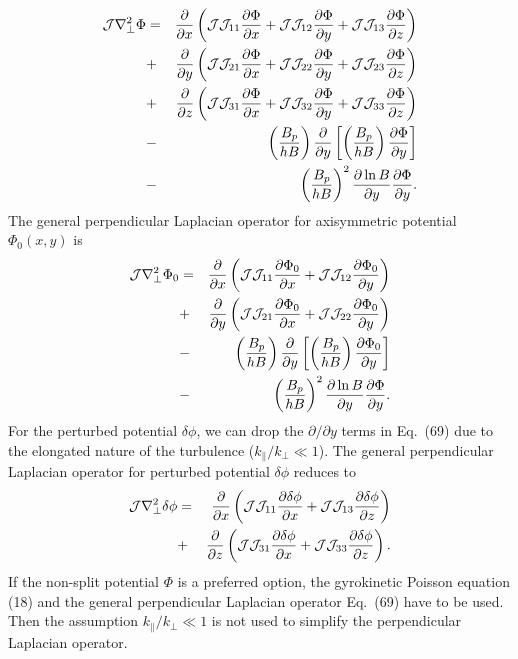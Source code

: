 \documentclass [11pt]{article}
\begin{document}
\begin{eqnarray}
{\cal J}\nabla_\perp^2\Phi&=&{\partial\over\partial x}\left({\cal J}{\cal J}_{11}{\partial\Phi\over\partial x}
+{\cal J}{\cal J}_{12}{\partial\Phi\over\partial y}
+{\cal J}{\cal J}_{13}{\partial\Phi\over\partial z}\right) \nonumber\\
&+&{\partial\over\partial y}\left({\cal J}{\cal J}_{21}{\partial\Phi\over\partial x}
+{\cal J}{\cal J}_{22}{\partial\Phi\over\partial y}
+{\cal J}{\cal J}_{23}{\partial\Phi\over\partial z}\right) \nonumber\\
&+&{\partial\over\partial z}\left({\cal J}{\cal J}_{31}{\partial\Phi\over\partial x}
+{\cal J}{\cal J}_{32}{\partial\Phi\over\partial y}
+{\cal J}{\cal J}_{33}{\partial\Phi\over\partial z}\right) \nonumber\\
&-&\left({B_p\over hB}\right){\partial\over\partial y}
\left[\left({B_p\over hB}\right){\partial\Phi\over\partial y}\right] \nonumber\\
&-&\left({B_p\over hB}\right)^2{\partial\ln B\over\partial y}{\partial\Phi\over\partial y}.
\end{eqnarray}
The general perpendicular Laplacian operator for axisymmetric potential $\Phi_0(x,y)$ is
\begin{eqnarray}
{\cal J}\nabla_\perp^2\Phi_0&=&{\partial\over\partial x}\left({\cal J}{\cal J}_{11}{\partial\Phi_0\over\partial x}
+{\cal J}{\cal J}_{12}{\partial\Phi_0\over\partial y}\right) \nonumber\\
&+&{\partial\over\partial y}\left({\cal J}{\cal J}_{21}{\partial\Phi_0\over\partial x}
+{\cal J}{\cal J}_{22}{\partial\Phi_0\over\partial y}\right) \nonumber\\
&-&\left({B_p\over hB}\right){\partial\over\partial y}
\left[\left({B_p\over hB}\right){\partial\Phi_0\over\partial y}\right]  \nonumber\\
&-&\left({B_p\over hB}\right)^2{\partial\ln B\over\partial y}{\partial\Phi\over\partial y}.
\end{eqnarray}
For the perturbed potential $\delta\phi$, we can drop the $\partial/\partial y$ terms in Eq.~(69) 
due to the elongated nature of the turbulence ($k_\|/k_\perp\ll1$).
The general perpendicular Laplacian operator for perturbed potential $\delta\phi$ reduces to
\begin{eqnarray}
{\cal J}\nabla_\perp^2\delta\phi&=&
{\partial\over\partial x}\left({\cal J}{\cal J}_{11}{\partial\delta\phi\over\partial x}
+{\cal J}{\cal J}_{13}{\partial\delta\phi\over\partial z}\right) \nonumber\\
&+&{\partial\over\partial z}\left({\cal J}{\cal J}_{31}{\partial\delta\phi\over\partial x}
+{\cal J}{\cal J}_{33}{\partial\delta\phi\over\partial z}\right).
\end{eqnarray}
If the non-split potential $\Phi$ is a preferred option, the gyrokinetic Poisson equation (18) and the 
general perpendicular Laplacian operator Eq.~(69) have to be used. Then the assumption 
$k_\|/k_\perp\ll1$ is not used to simplify the perpendicular Laplacian operator.
\end{document}

